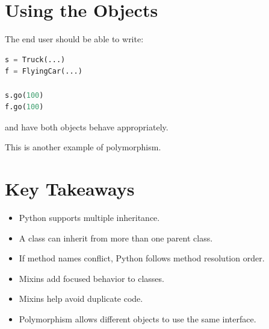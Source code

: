 \documentclass[11pt]{article}
\begin{document}
\section{Using the Objects}

The end user should be able to write:

\begin{lstlisting}[language=Python]
s = Truck(...)
f = FlyingCar(...)

s.go(100)
f.go(100)
\end{lstlisting}

and have both objects behave appropriately.

This is another example of polymorphism.

\section{Key Takeaways}

\begin{itemize}
    \item Python supports multiple inheritance.
    \item A class can inherit from more than one parent class.
    \item If method names conflict, Python follows method resolution order.
    \item Mixins add focused behavior to classes.
    \item Mixins help avoid duplicate code.
    \item Polymorphism allows different objects to use the same interface.
\end{itemize}
\end{document}
